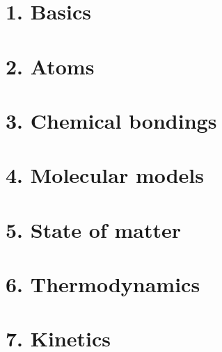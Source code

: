 \documentclass{cheatsheet}
\author{Noa Sendlhofer \& Christian Leser \\ nsendlhofer \& cleser \\ \vspace*{0.2em} \normalsize{partly based on the work by L. Hoffmann \& D. Vermee \\ lhoffma \& dvermee} \vspace*{-0.2em}}
\begin{document}
\section{1. Basics} %
	

\section{2. Atoms} %
	
	

\section{3. Chemical bondings} %
	
	
	
	
	
	

\section{4. Molecular models} %
	
	

\section{5. State of matter} %
	
	
	
	
	

\section{6. Thermodynamics} %
	
	
	
	
	
	
	

\section{7. Kinetics} %
	
	
	
	
	
	
	
	
	
\end{document}
